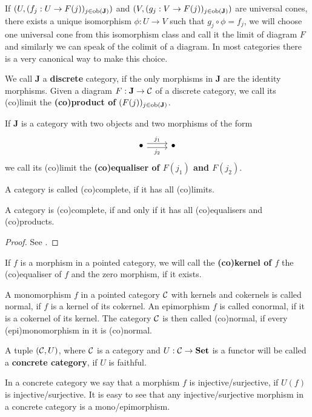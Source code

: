 \begin{remark}
    If $(U, (f_j : U \to F(j))_{j\in\mathbf{\text{ob}(J)}})$ and $(V, (g_j : V \to F(j))_{j\in\mathbf{\text{ob}(J)}})$ are universal cones, 
    there exists a unique isomorphism $\phi: U \to V$ such that $g_j\circ\phi=f_j$, we will choose one universal cone from this isomorphism class 
    and call it the limit of diagram $F$ and similarly we can speak of the colimit of a diagram. In most categories there is a very canonical way to make this choice. 
\end{remark}
\begin{definition}
    We call $\mathbf{J}$ a \textbf{discrete} category, if the only morphisms in $\mathbf{J}$ are the identity morphisms.
    Given a diagram $F:\mathbf{J}\to\mathcal{C}$ of a discrete category, we call its (co)limit the \textbf{(co)product of $(F(j))_{j\in\text{ob}(\mathbf{J})}$}.
\end{definition}
\begin{definition}
    If $\mathbf{J}$ is a category with two objects and two morphisms
    of the form 
        \[\begin{tikzcd}
        \bullet & \bullet
        \arrow["{j_1}", shift left, from=1-1, to=1-2]
        \arrow["{j_2}"', shift right, from=1-1, to=1-2]
    \end{tikzcd}\]
    we call its (co)limit the \textbf{(co)equaliser of $F(j_1)$ and $F(j_2)$}.
\end{definition}
\begin{definition}
    A category is called (co)complete, if it has all (co)limits.
\end{definition}
\begin{theorem}
    A category is (co)complete, if and only if it has all (co)equalisers and (co)products.
\end{theorem}
\begin{proof}
    See \cite[Proposition 5.1.26]{Leinster14}.
\end{proof}
\begin{definition}
    If $f$ is a morphism in a pointed category, we will call the \textbf{(co)kernel of $f$} the (co)equaliser of $f$ and the zero morphism, if it exists.
\end{definition}
\begin{definition}
    A monomorphism $f$ in a pointed category $\mathcal{C}$ with kernels and cokernels is called normal, if $f$ is a kernel of its cokernel. An 
    epimorphism $f$ is called conormal, if it is a cokernel of its kernel. The category $\mathcal{C}$ is then called 
    (co)normal, if every (epi)monomorphism 
    in it is (co)normal.
\end{definition}
\begin{definition}
    A tuple $(\mathcal{C},U)$, where $\mathcal{C}$ is a category and $U:\mathcal{C}\to\mathbf{Set}$ is a functor will be called a \textbf{concrete category}, if $U$ is faithful.
\end{definition}
    In a concrete category we say that a morphism $f$ is injective/surjective, if $U(f)$ is injective/surjective. It is easy to see 
    that any injective/surjective morphism in a concrete category is a mono/epimorphism.
\iffalse
